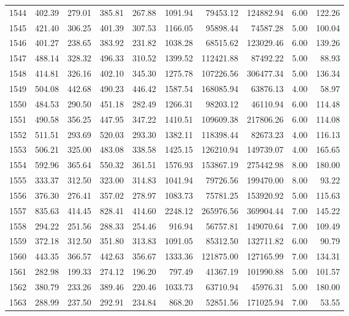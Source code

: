 \begin{tabular}{lrrrrrrrrr}
1544 & 402.39 & 279.01 & 385.81 & 267.88 & 1091.94 & 79453.12 & 124882.94 & 6.00 & 122.26 \\
1545 & 421.40 & 306.25 & 401.39 & 307.53 & 1166.05 & 95898.44 & 74587.28 & 5.00 & 100.04 \\
1546 & 401.27 & 238.65 & 383.92 & 231.82 & 1038.28 & 68515.62 & 123029.46 & 6.00 & 139.26 \\
1547 & 488.14 & 328.32 & 496.33 & 310.52 & 1399.52 & 112421.88 & 87492.22 & 5.00 & 88.93 \\
1548 & 414.81 & 326.16 & 402.10 & 345.30 & 1275.78 & 107226.56 & 306477.34 & 5.00 & 136.34 \\
1549 & 504.08 & 442.68 & 490.23 & 446.42 & 1587.54 & 168085.94 & 63876.13 & 4.00 & 58.97 \\
1550 & 484.53 & 290.50 & 451.18 & 282.49 & 1266.31 & 98203.12 & 46110.94 & 6.00 & 114.48 \\
1551 & 490.58 & 356.25 & 447.95 & 347.22 & 1410.51 & 109609.38 & 217806.26 & 6.00 & 114.08 \\
1552 & 511.51 & 293.69 & 520.03 & 293.30 & 1382.11 & 118398.44 & 82673.23 & 4.00 & 116.13 \\
1553 & 506.21 & 325.00 & 483.08 & 338.58 & 1425.15 & 126210.94 & 149739.07 & 4.00 & 165.65 \\
1554 & 592.96 & 365.64 & 550.32 & 361.51 & 1576.93 & 153867.19 & 275442.98 & 8.00 & 180.00 \\
1555 & 333.37 & 312.50 & 323.00 & 314.83 & 1041.94 & 79726.56 & 199470.00 & 8.00 & 93.22 \\
1556 & 376.30 & 276.41 & 357.02 & 278.97 & 1083.73 & 75781.25 & 153920.92 & 5.00 & 115.63 \\
1557 & 835.63 & 414.45 & 828.41 & 414.60 & 2248.12 & 265976.56 & 369904.44 & 7.00 & 145.22 \\
1558 & 294.22 & 251.56 & 288.33 & 254.46 & 916.94 & 56757.81 & 149070.64 & 7.00 & 109.49 \\
1559 & 372.18 & 312.50 & 351.80 & 313.83 & 1091.05 & 85312.50 & 132711.82 & 6.00 & 90.79 \\
1560 & 443.35 & 366.57 & 442.63 & 356.67 & 1333.36 & 121875.00 & 127165.99 & 7.00 & 134.31 \\
1561 & 282.98 & 199.33 & 274.12 & 196.20 & 797.49 & 41367.19 & 101990.88 & 5.00 & 101.57 \\
1562 & 380.79 & 233.26 & 389.46 & 220.46 & 1033.73 & 63710.94 & 45976.31 & 5.00 & 180.00 \\
1563 & 288.99 & 237.50 & 292.91 & 234.84 & 868.20 & 52851.56 & 171025.94 & 7.00 & 53.55 \\

\end{tabular}
